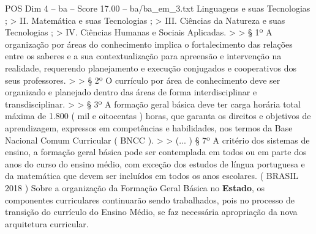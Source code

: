 \begin{textsample}{POS Dim 4 – ba – Score 17.00 – ba/ba\_em\_3.txt}
Linguagens e suas Tecnologias ; > II.
Matemática e suas Tecnologias ; > III.
Ciências da Natureza e suas Tecnologias ; > IV.
Ciências Humanas e Sociais Aplicadas. > > § 1º A organização por áreas do conhecimento implica o fortalecimento das relações entre os saberes e a sua contextualização para apreensão e intervenção na realidade, requerendo planejamento e execução conjugados e cooperativos dos seus professores. > > § 2º O currículo por área de conhecimento deve ser organizado e planejado dentro das áreas de forma interdisciplinar e transdisciplinar. > > § 3º A formação geral básica deve ter carga horária total máxima de 1.800 ( mil e oitocentas ) horas, que garanta os direitos e objetivos de aprendizagem, expressos em competências e habilidades, nos termos da Base Nacional Comum Curricular ( BNCC ). > > (... ) § 7º A critério dos sistemas de ensino, a formação geral básica pode ser contemplada em todos ou em parte dos anos do curso do ensino médio, com exceção dos estudos de língua portuguesa e da matemática que devem ser incluídos em todos os anos escolares. ( BRASIL 2018 ) Sobre a organização da Formação Geral Básica no \textbf{Estado}, os componentes curriculares continuarão sendo trabalhados, pois no processo de transição do currículo do Ensino Médio, se faz necessária apropriação da nova arquitetura curricular.

\end{textsample}
